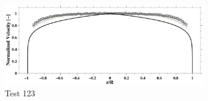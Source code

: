 \documentclass{article}
\begin{document}
\begin{figure}
\centering
\includegraphics[width = 0.8\textwidth]{./Figures/FlowProfile_Large}
\caption{Test 123}
\end{figure}

\cite{Peter2011}
\cite{Mungur1969}
\printbibliography
\end{document}
